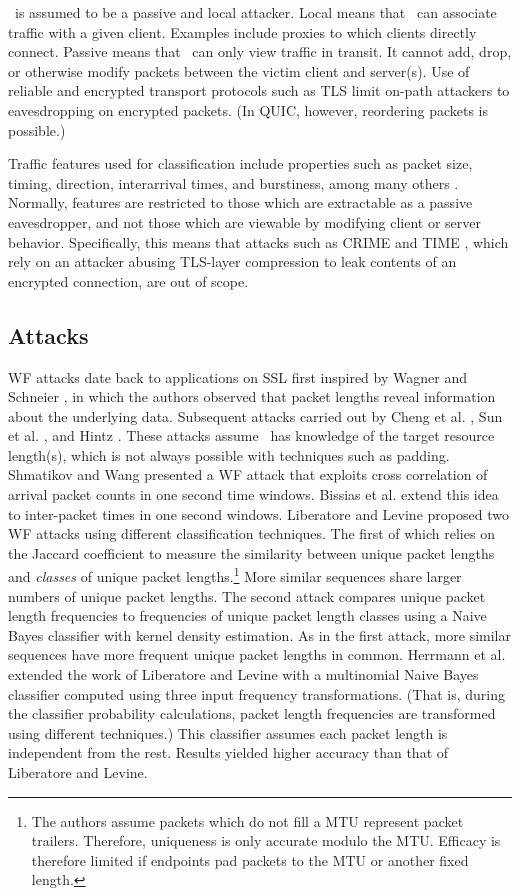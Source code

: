 \documentclass[runningheads]{llncs}
\begin{document}
\adv\ is assumed to be a passive and local attacker. Local means that \adv\ can associate
traffic with a given client. Examples include proxies to which clients directly connect.
Passive means that \adv\ can only view traffic in transit. It cannot add, drop, or otherwise
modify packets between the victim client and server(s). Use of reliable and encrypted transport
protocols such as TLS limit on-path attackers to eavesdropping on encrypted packets. (In
QUIC, however, reordering packets is possible.)

Traffic features used for classification include properties such as packet size, timing,
direction, interarrival times, and burstiness, among many others \cite{wang2016website}. Normally, features
are restricted to those which are extractable as a passive eavesdropper, and not those which
are viewable by modifying client or server behavior. Specifically, this means that
attacks such as CRIME \cite{} and TIME \cite{}, which rely on an attacker abusing TLS-layer compression
to leak contents of an encrypted connection, are out of scope.

\subsection{Attacks}
WF attacks date back to applications on SSL first inspired by Wagner and
Schneier \cite{wagner1996analysis}, in which the authors observed that
packet lengths reveal information about the underlying data. Subsequent attacks
carried out by Cheng et al. \cite{cheng1998traffic},
Sun et al. \cite{sun2002statistical}, and Hintz \cite{hintz2002fingerprinting}.
These attacks assume \adv\ has knowledge of the target resource length(s),
which is not always possible with techniques such as padding. Shmatikov and Wang \cite{shmatikov2006timing}
presented a WF attack that exploits cross correlation of arrival packet counts in
one second time windows. Bissias et al. \cite{bissias2005privacy} extend this idea to inter-packet
times in one second windows. Liberatore and Levine \cite{liberatore2006inferring} proposed two WF attacks
using different classification techniques. The first of which relies on the Jaccard
coefficient to measure the similarity between unique packet lengths and \emph{classes}
of unique packet lengths.\footnote{The authors assume packets which do not fill a MTU
represent packet trailers. Therefore, uniqueness is only accurate modulo the MTU. Efficacy
is therefore limited if endpoints pad packets to the MTU or another fixed length.}
More similar sequences share larger numbers of unique packet lengths. The second
attack compares unique packet length frequencies to frequencies of unique packet length
classes using a Naive Bayes classifier with kernel density estimation. As in the first
attack, more similar sequences have more frequent unique packet lengths in common.
Herrmann et al. \cite{herrmann2009website} extended the work of Liberatore and Levine with a multinomial
Naive Bayes classifier computed using three input frequency transformations.
(That is, during the classifier probability calculations, packet length frequencies are
transformed using different techniques.) This classifier assumes each packet length is
independent from the rest. Results yielded higher accuracy than that of Liberatore and Levine.
\end{document}
